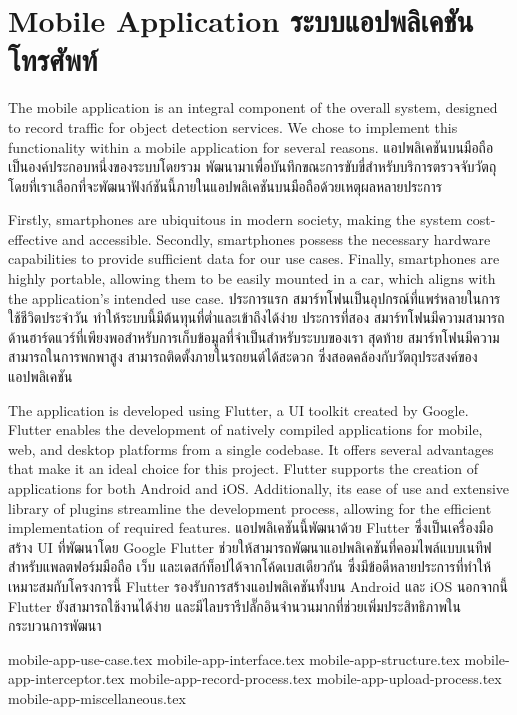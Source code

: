 \section{\ifenglish Mobile Application \else ระบบแอปพลิเคชันโทรศัพท์ \fi}
\ifenglish
The mobile application is an integral component of the overall system, designed to record traffic for object detection services. We chose to implement this functionality within a mobile application for several reasons.
\else
แอปพลิเคชันบนมือถือเป็นองค์ประกอบหนึ่งของระบบโดยรวม พัฒนามาเพื่อบันทึกขณะการขับขี่สำหรับบริการตรวจจับวัตถุ โดยที่เราเลือกที่จะพัฒนาฟังก์ชันนี้ภายในแอปพลิเคชันบนมือถือด้วยเหตุผลหลายประการ
\fi

\ifenglish
Firstly, smartphones are ubiquitous in modern society, making the system cost-effective and accessible. Secondly, smartphones possess the necessary hardware capabilities to provide sufficient data for our use cases. Finally, smartphones are highly portable, allowing them to be easily mounted in a car, which aligns with the application's intended use case.
\else
ประการแรก สมาร์ทโฟนเป็นอุปกรณ์ที่แพร่หลายในการใช้ชีวิตประจำวัน ทำให้ระบบนี้มีต้นทุนที่ต่ำและเข้าถึงได้ง่าย ประการที่สอง สมาร์ทโฟนมีความสามารถด้านฮาร์ดแวร์ที่เพียงพอสำหรับการเก็บข้อมูลที่จำเป็นสำหรับระบบของเรา สุดท้าย สมาร์ทโฟนมีความสามารถในการพกพาสูง สามารถติดตั้งภายในรถยนต์ได้สะดวก ซึ่งสอดคล้องกับวัตถุประสงค์ของแอปพลิเคชัน
\fi

\ifenglish
The application is developed using Flutter, a UI toolkit created by Google. Flutter enables the development of natively compiled applications for mobile, web, and desktop platforms from a single codebase. It offers several advantages that make it an ideal choice for this project. Flutter supports the creation of applications for both Android and iOS. Additionally, its ease of use and extensive library of plugins streamline the development process, allowing for the efficient implementation of required features.
\else
แอปพลิเคชันนี้พัฒนาด้วย Flutter ซึ่งเป็นเครื่องมือสร้าง UI ที่พัฒนาโดย Google Flutter ช่วยให้สามารถพัฒนาแอปพลิเคชันที่คอมไพล์แบบเนทีฟสำหรับแพลตฟอร์มมือถือ เว็บ และเดสก์ท็อปได้จากโค้ดเบสเดียวกัน ซึ่งมีข้อดีหลายประการที่ทำให้เหมาะสมกับโครงการนี้ Flutter รองรับการสร้างแอปพลิเคชันทั้งบน Android และ iOS นอกจากนี้ Flutter ยังสามารถใช้งานได้ง่าย และมีไลบรารีปลั๊กอินจำนวนมากที่ช่วยเพิ่มประสิทธิภาพในกระบวนการพัฒนา
\fi

\newcommand{\dir}{chapters/approach/mobile-app}
{mobile-app-use-case.tex}
{mobile-app-interface.tex}
{mobile-app-structure.tex}
{mobile-app-interceptor.tex}
{mobile-app-record-process.tex}
{mobile-app-upload-process.tex}
{mobile-app-miscellaneous.tex}
